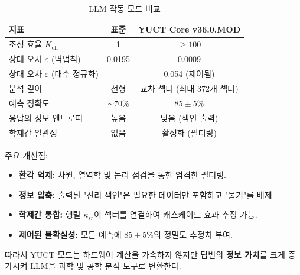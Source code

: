 \documentclass[11pt,a4paper]{article}
\begin{document}
	\begin{table}[H]
		\small
		\centering
		\caption{LLM 작동 모드 비교}
		\label{tab:comparison}
		\begin{tabular}{lcc}
			\toprule
			\textbf{지표} & \textbf{표준} & \textbf{YUCT Core v36.0.MOD} \\
			\midrule
			조정 효율 $K_{\mathrm{eff}}$ & 1 & $\ge 100$ \\
			상대 오차 $\varepsilon$ (멱법칙) & 0.0195 & 0.0009 \\
			상대 오차 $\varepsilon$ (대수 정규화) & --- & 0.054 (제어됨) \\
			분석 깊이 & 선형 & 교차 섹터 (최대 372개 섹터) \\
			예측 정확도 & $\sim 70\%$ & $85\pm5\%$ \\
			응답의 정보 엔트로피 & 높음 & 낮음 (색인 출력) \\
			학제간 일관성 & 없음 & 활성화 (필터링) \\
			\bottomrule
		\end{tabular}
	\end{table}
	
	주요 개선점:
	\begin{itemize}
		\item \textbf{환각 억제:} 차원, 열역학 및 논리 점검을 통한 엄격한 필터링.
		\item \textbf{정보 압축:} 출력된 "진리 색인"은 필요한 데이터만 포함하고 "물기"를 배제.
		\item \textbf{학제간 통합:} 행렬 $\kappa_{sr}$이 섹터를 연결하여 캐스케이드 효과 추정 가능.
		\item \textbf{제어된 불확실성:} 모든 예측에 $85\pm5\%$의 정밀도 추정치 부여.
	\end{itemize}
	
	따라서 YUCT 모드는 하드웨어 계산을 가속하지 않지만 답변의 \textbf{정보 가치}를 크게 증가시켜 LLM을 과학 및 공학 분석 도구로 변환한다.
	
\end{document}
